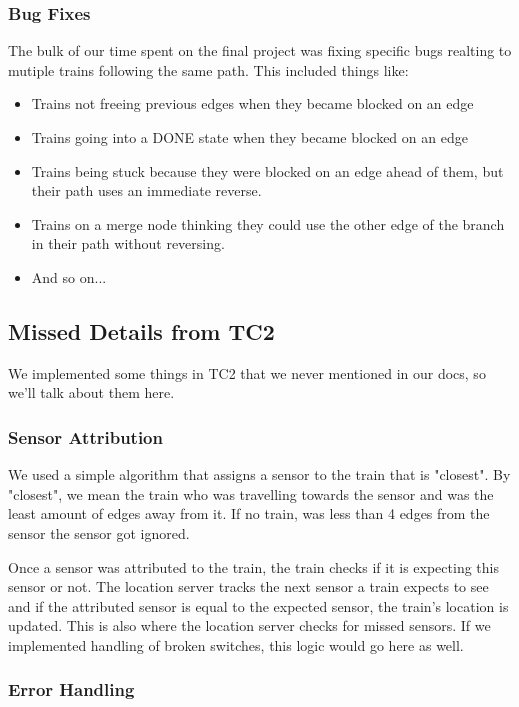 \documentclass[letterpaper]{article}
\begin{document}
\subsubsection{Bug Fixes}

The bulk of our time spent on the final project was fixing specific bugs realting to mutiple trains following the same path. This included things like:

\begin{itemize}
	\item Trains not freeing previous edges when they became blocked on an edge
	\item Trains going into a DONE state when they became blocked on an edge
	\item Trains being stuck because they were blocked on an edge ahead of them, but their path uses an immediate reverse.
	\item Trains on a merge node thinking they could use the other edge of the branch in their path without reversing.
	\item And so on...
\end{itemize}

\subsection{Missed Details from TC2}

We implemented some things in TC2 that we never mentioned in our docs, so we'll talk about them here.

\subsubsection{Sensor Attribution}

We used a simple algorithm that assigns a sensor to the train that is "closest". By "closest", we mean the train who was travelling towards the sensor and was the least amount of edges away from it. If no train, was less than 4 edges from the sensor the sensor got ignored.

Once a sensor was attributed to the train, the train checks if it is expecting this sensor or not. The location server tracks the next sensor a train expects to see and if the attributed sensor is equal to the expected sensor, the train's location is updated. This is also where the location server checks for missed sensors. If we implemented handling of broken switches, this logic would go here as well.

\subsubsection{Error Handling}
\end{document}
